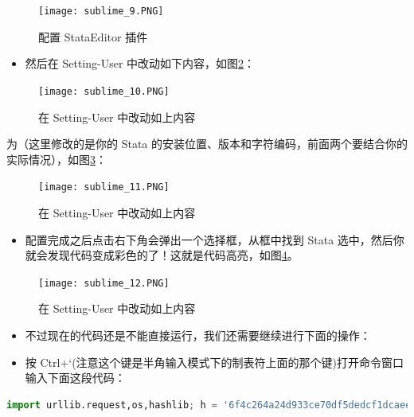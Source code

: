 \documentclass[cn,fancy,blue,11pt]{elegantbook}
\begin{document}
\begin{figure}[htbp]
  \centering
  \texttt{[image: sublime\_9.PNG]}
  \caption{配置 StataEditor 插件}
  \label{fig:sublime_9}
\end{figure}

\begin{itemize}
\item
  然后在 Setting-User 中改动如下内容，如图\ref{fig:sublime_10}：
\end{itemize}

\begin{figure}[htbp]
  \centering
  \texttt{[image: sublime\_10.PNG]}
  \caption{在 Setting-User 中改动如上内容}
  \label{fig:sublime_10}
\end{figure}

为（这里修改的是你的 Stata 的安装位置、版本和字符编码，前面两个要结合你的实际情况），如图\ref{fig:sublime_11}：

\begin{figure}[htbp]
  \centering
  \texttt{[image: sublime\_11.PNG]}
  \caption{在 Setting-User 中改动如上内容}
  \label{fig:sublime_11}
\end{figure}

\begin{itemize}
\item
  配置完成之后点击右下角会弹出一个选择框，从框中找到 Stata 选中，然后你就会发现代码变成彩色的了！这就是代码高亮，如图\ref{fig:sublime_12}。
\end{itemize}

\begin{figure}[htbp]
  \centering
  \texttt{[image: sublime\_12.PNG]}
  \caption{在 Setting-User 中改动如上内容}
  \label{fig:sublime_12}
\end{figure}

\begin{itemize}
\item
  不过现在的代码还是不能直接运行，我们还需要继续进行下面的操作：
\item
  按 Ctrl+`(注意这个键是半角输入模式下的制表符上面的那个键)打开命令窗口输入下面这段代码：
\end{itemize}

\begin{lstlisting}[language=Python]
  import urllib.request,os,hashlib; h = '6f4c264a24d933ce70df5dedcf1dcaee' + 'ebe013ee18cced0ef93d5f746d80ef60'; pf = 'Package Control.sublime-package'; ipp = sublime.installed_packages_path(); urllib.request.install_opener( urllib.request.build_opener( urllib.request.ProxyHandler()) ); by = urllib.request.urlopen( 'http://packagecontrol.io/' + pf.replace(' ', '%20')).read(); dh = hashlib.sha256(by).hexdigest(); print('Error validating download (got %s instead of %s), please try manual install' % (dh, h)) if dh != h else open(os.path.join( ipp, pf), 'wb' ).write(by)
\end{lstlisting}
\end{document}
